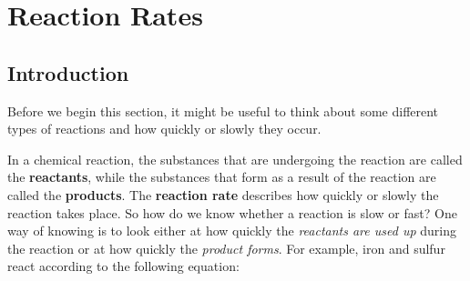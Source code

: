 \chapter{Reaction Rates}
\label{chap:ReactionRates}



\section{Introduction}

Before we begin this section, it might be useful to think about some different types of reactions and how quickly or slowly they occur.


In a chemical reaction, the substances that are undergoing the reaction are called the \textbf{reactants}, while the substances that form as a result of the reaction are called the \textbf{products}. The \textbf{reaction rate} describes how quickly or slowly the reaction takes place. So how do we know whether a reaction is slow or fast? One way of knowing is to look either at how quickly the \textit{reactants are used up} during the reaction or at how quickly the \textit{product forms}. For example, iron and sulfur react according to the following equation:

